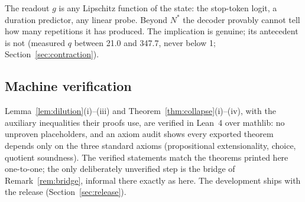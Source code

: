 The readout $g$ is any Lipschitz function of the state: the stop-token
logit, a duration predictor, any linear probe. Beyond $N^\ast$ the decoder
provably cannot tell how many repetitions it has produced. The implication
is genuine; its antecedent is not (measured $q$ between 21.0 and 347.7,
never below 1; Section~\ref{sec:contraction}).

\subsection{Machine verification}

Lemma~\ref{lem:dilution}(i)--(iii) and
Theorem~\ref{thm:collapse}(i)--(iv), with the auxiliary inequalities
their proofs use, are verified in Lean~4 over mathlib: no unproven
placeholders, and an axiom audit shows every exported theorem depends only
on the three standard axioms (propositional extensionality, choice,
quotient soundness). The verified statements match the theorems printed
here one-to-one; the only deliberately unverified step is the bridge of
Remark~\ref{rem:bridge}, informal there exactly as here. The development
ships with the release (Section~\ref{sec:release}).
